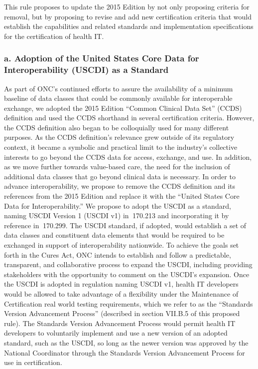 \documentclass[twoside,11pt]{article}
\begin{document}
          This rule proposes to update the 2015 Edition by not only proposing criteria for removal, but by proposing to revise and add new certification criteria that would establish the capabilities and related standards and implementation specifications for the certification of health IT.


          \subsubsection{a. Adoption of the United States Core Data for Interoperability (USCDI) as a Standard}


          As part of ONC's continued efforts to assure the availability of a minimum baseline of data classes that could be commonly available for interoperable exchange, we adopted the 2015 Edition “Common Clinical Data Set” (CCDS) definition and used the CCDS shorthand in several certification criteria. However, the CCDS definition also began to be colloquially used for many different purposes. As the CCDS definition's relevance grew outside of its regulatory context, it became a symbolic and practical limit to the industry's collective interests to go beyond the CCDS data for access, exchange, and use. In addition, as we move further towards value-based care, the need for the inclusion of additional data classes that go beyond clinical data is necessary. In order to advance interoperability, we propose to remove the CCDS definition and its references  \ifhmode\expandafter\xspace\fi from the 2015 Edition and replace it with the “United States Core Data for Interoperability.” We propose to adopt the USCDI as a standard, naming USCDI Version 1 (USCDI v1) in \textsection{} 170.213 and incorporating it by reference in \textsection{} 170.299. The USCDI standard, if adopted, would establish a set of data classes and constituent data elements that would be required to be exchanged in support of interoperability nationwide. To achieve the goals set forth in the Cures Act, ONC intends to establish and follow a predictable, transparent, and collaborative process to expand the USCDI, including providing stakeholders with the opportunity to comment on the USCDI's expansion. Once the USCDI is adopted in regulation naming USCDI v1, health IT developers would be allowed to take advantage of a flexibility under the Maintenance of Certification real world testing requirements, which we refer to as the “Standards Version Advancement Process” (described in section VII.B.5 of this proposed rule). The Standards Version Advancement Process would permit health IT developers to voluntarily implement and use a new version of an adopted standard, such as the USCDI, so long as the newer version was approved by the National Coordinator through the Standards Version Advancement Process for use in certification.
\end{document}
